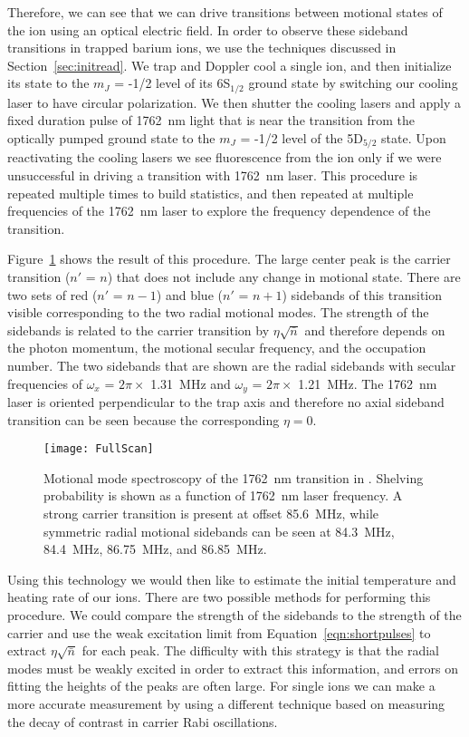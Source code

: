 Therefore, we can see that we can drive transitions between motional states of the ion using an optical electric field.  In order to observe these sideband transitions in trapped barium ions, we use the techniques discussed in Section~\ref{sec:initread}.  We trap and Doppler cool a single \ba ion, and then initialize its state to the $m_J$ = -1/2 level of its 6S$_{1/2}$ ground state by switching our cooling laser to have circular polarization.  We then shutter the cooling lasers and apply a fixed duration pulse of 1762~nm light that is near the transition from the optically pumped ground state to the $m_J$ = -1/2 level of the 5D$_{5/2}$ state.  Upon reactivating the cooling lasers we see fluorescence from the ion only if we were unsuccessful in driving a transition with 1762~nm laser.  This procedure is repeated multiple times to build statistics, and then repeated at multiple frequencies of the 1762~nm laser to explore the frequency dependence of the transition. 

Figure~\ref{fig:freqscan} shows the result of this procedure.  The large center peak is the carrier transition ($n'$ = $n$) that does not include any change in motional state.  There are two sets of red ($n'$ = $n-1$) and blue ($n'$ = $n+1$) sidebands of this transition visible corresponding to the two radial motional modes.  The strength of the sidebands is related to the carrier transition by $\eta \sqrt{\bar{n}}$ and therefore depends on the photon momentum, the motional secular frequency, and the occupation number.  The two sidebands that are shown are the radial sidebands with secular frequencies of $\omega_x$ = $2 \pi \times$ 1.31~MHz and $\omega_y$ = $2 \pi \times$ 1.21~MHz.  The 1762~nm laser is oriented perpendicular to the trap axis and therefore no axial sideband transition can be seen because the corresponding $\eta = 0$.

\begin{figure}
	\centering
	\texttt{[image: FullScan]}
\caption[Motional mode spectroscopy of the 1762~nm transition in \ba]{Motional mode spectroscopy of the 1762~nm transition in \ba.  Shelving probability is shown as a function of 1762~nm laser frequency.  A strong carrier transition is present at offset 85.6~MHz, while symmetric radial motional sidebands can be seen at 84.3~MHz, 84.4~MHz, 86.75~MHz, and 86.85~MHz.}
	\label{fig:freqscan}
\end{figure}

Using this technology we would then like to estimate the initial temperature and heating rate of our ions.  There are two possible methods for performing this procedure.  We could compare the strength of the sidebands to the strength of the carrier and use the weak excitation limit from Equation~\ref{eqn:shortpulses} to extract $\eta \sqrt{\bar{n}}$ for each peak.  The difficulty with this strategy is that the radial modes must be weakly excited in order to extract this information, and errors on fitting the heights of the peaks are often large.  For single ions we can make a more accurate measurement by using a different technique based on measuring the decay of contrast in carrier Rabi oscillations.

